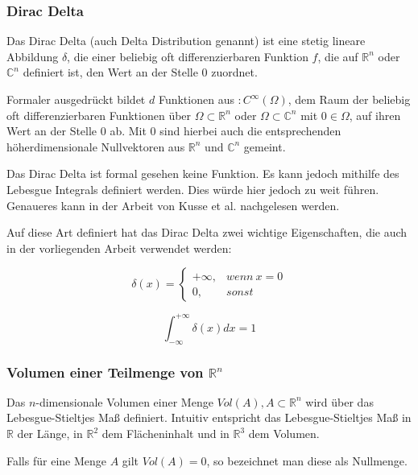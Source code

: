 \documentclass[a4paper,fontsize=12pt,toc=bib,halfparskip]{scrartcl}
\begin{document}
\subsubsection{Dirac Delta}
Das Dirac Delta (auch Delta Distribution genannt) ist eine stetig lineare Abbildung $\delta$, die einer beliebig oft differenzierbaren Funktion $f$, die auf $\mathbb{R}^n$ oder $\mathbb{C}^n$ definiert ist, den Wert an der Stelle 0 zuordnet.

Formaler ausgedr\"uckt bildet $d$ Funktionen aus $:C^{\infty}(\Omega)$, dem Raum der beliebig oft differenzierbaren Funktionen \"uber $\Omega \subset \mathbb{R}^n$ oder $\Omega \subset \mathbb{C}^n$ mit $0 \in \Omega$, auf ihren Wert an der Stelle 0 ab. Mit 0 sind hierbei auch die entsprechenden h\"oherdimensionale Nullvektoren aus $\mathbb{R}^n$ und $\mathbb{C}^n$ gemeint.

Das Dirac Delta ist formal gesehen keine Funktion. Es kann jedoch mithilfe des Lebesgue Integrals definiert werden. Dies w\"urde hier jedoch zu weit f\"uhren. Genaueres kann in der Arbeit von Kusse et al. \cite[S.~100~ff.]{kusse2010mathematical} nachgelesen werden.

Auf diese Art definiert hat das Dirac Delta zwei wichtige Eigenschaften, die auch in der vorliegenden Arbeit verwendet werden:

\begin{equation}
	\delta(x)=
	\left\{
	\begin{array}{ll}
		+\infty, & wenn~x = 0\\
		0, & sonst
	\end{array}
	\right.
\end{equation}

\begin{equation}
	\int_{-\infty}^{+\infty}\delta(x)dx = 1
\end{equation}

\subsubsection{Volumen einer Teilmenge von \texorpdfstring{$\mathbb{R}^n$}{}}
Das $n$-dimensionale Volumen einer Menge $Vol(A), A \subset \mathbb{R}^n$ wird \"uber das Lebesgue-Stieltjes Ma{\ss} definiert\cite{kusolitsch2014mass}. Intuitiv entspricht das Lebesgue-Stieltjes Ma{\ss} in $\mathbb{R}$ der L\"ange, in $\mathbb{R}^2$ dem Fl\"acheninhalt und in $\mathbb{R}^3$ dem Volumen.

Falls f\"ur eine Menge $A$ gilt $Vol(A)=0$, so bezeichnet man diese als Nullmenge.
\end{document}
